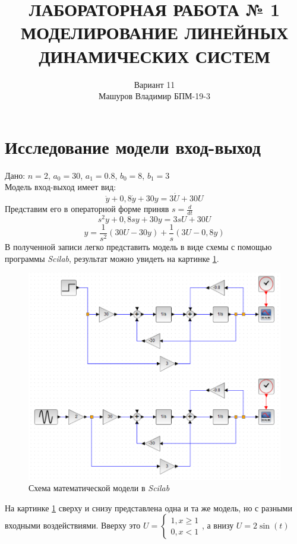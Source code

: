 \documentclass[a4paper, 12pt]{article}
\title{ЛАБОРАТОРНАЯ РАБОТА № 1 \\
МОДЕЛИРОВАНИЕ ЛИНЕЙНЫХ ДИНАМИЧЕСКИХ
СИСТЕМ
}
\author{Вариант 11 \\ Машуров Владимир БПМ-19-3}
\begin{document}
\maketitle
\thispagestyle{empty}
\newpage
\tableofcontents

\section{Исследование модели вход-выход}

Дано: $ n = 2 $, $ a_0 = 30 $, $  a_1 = 0.8 $, $  b_0 = 8 $, $  b_1 = 3 $ \\
Модель вход-выход имеет вид:
$$ \ddot{y} + 0,8\dot{y}+30y=3\dot{U} + 30U $$
Представим его в операторной форме приняв $s=\frac{d}{dt}$
$$ s^2y + 0,8sy + 30y = 3sU + 30U $$
$$ y = \frac{1}{s^2}(30U - 30y) + \frac{1}{s}(3U - 0,8y) $$
В полученной записи легко представить модель в виде схемы с помощью программы \textit{Scilab}, результат можно увидеть на картинке \ref{p:Схема1}.

\begin{figure}[h!]
	\centering
	\includegraphics[scale=0.52]{scheme1}
	\caption{Схема математической модели в \textit{Scilab}}
	\label{p:Схема1}
\end{figure}   

На картинке \ref{p:Схема1} сверху и снизу представлена одна и та же модель, но с разными входными воздействиями. Вверху это $U = \begin{cases} 1, x \geq 1 \\ 0, x < 1 \end{cases}$, а внизу $U = 2\sin(t)$ 
\end{document}
